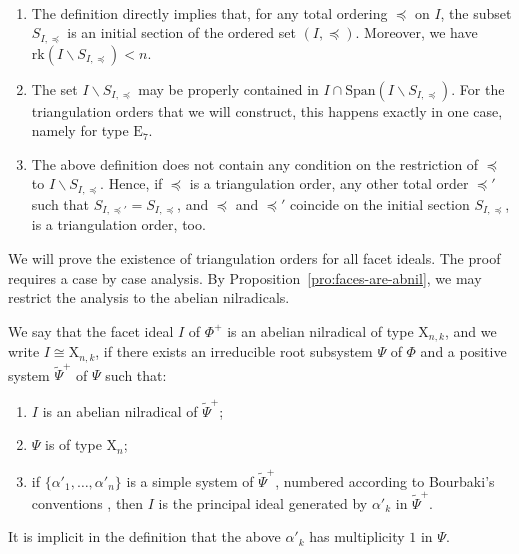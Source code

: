 \documentclass[ALCO,published]{cedram}
\theoremstyle{plain}
\newcommand\wt{\widetilde}
\newcommand\smeno{\smallsetminus}
\newcommand\gen{\mathrm{Span}}
\newcommand\rk{\mathrm{rk}}
\newcommand\al{\alpha}
\newcommand\preq{\preccurlyeq}
\begin{document}
\begin{rem}\label{rem:ini-sec}~\\[-1em]
\begin{enumerate}
\item
The definition directly implies that, for any total ordering $\preq$  on $I$, the subset $S_{I,\preq}$ is an initial section of the ordered set $(I, \preq)$.
Moreover, we have $\rk(I\smeno S_{I,\preq})< n$.
\item 
The set $I\smeno S_{I,\preq}$ may be properly contained in $I\cap \gen(I\smeno S_{I,\preq})$. 
For the triangulation orders that we will construct, this
happens exactly in one case, namely for type $\mathrm E_{7}$.
\item
The above definition does not contain any condition on the restriction of $\preq$ to $I\smeno S_{I,\preq}$. 
Hence, if $\preq$ is a triangulation order, any other total order $\preq'$ such that  $S_{I,\preq'}=S_{I,\preq}$, and  $\preq$ and $\preq'$ coincide on the initial section $S_{I,\preq}$, is a triangulation order, too.
\end{enumerate}
\end{rem}

We will prove the existence of triangulation orders for all facet ideals.  
The proof requires a case by case analysis. 
By Proposition~\ref{pro:faces-are-abnil}, we may restrict the analysis to the abelian nilradicals.

\begin{defi}
We say that the facet ideal $I$ of $\Phi^+$  is an abelian nilradical of type $\mathrm X_{n,k}$, and we write $I\cong \mathrm X_{n,k}$, if there exists an irreducible root subsystem $\Psi$ of $\Phi$ and a positive system $\wt \Psi^+$ of $\Psi$ such that: 
\begin{enumerate}
\item
$I$ is an abelian nilradical of $\wt \Psi^+$;
\item 
$\Psi$ is of type $\mathrm X_n$; 
\item 
if $\{\al'_1, \dots, \al'_n\}$ is a simple system of $\wt \Psi^+$, numbered according to Bourbaki's conventions \cite{Bou}, then $I$ is the principal ideal generated by $\al'_k$ in $\wt \Psi^+$.
\end{enumerate}
\end{defi}

It is implicit in the definition that the above $\al'_k$ has multiplicity $1$ in $\Psi$. 
\end{document}
